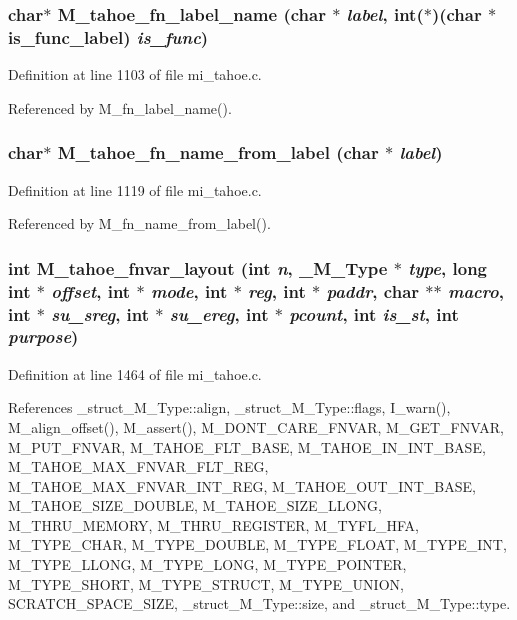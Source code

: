\subsubsection{\setlength{\rightskip}{0pt plus 5cm}char$\ast$ M\_\-tahoe\_\-fn\_\-label\_\-name (char $\ast$ {\em label}, int($\ast$)(char $\ast$is\_\-func\_\-label) {\em is\_\-func})}\label{mi__tahoe_8c_01d1fd9ed229f1ab0d78531f1cf54613}




Definition at line 1103 of file mi\_\-tahoe.c.

Referenced by M\_\-fn\_\-label\_\-name().
\subsubsection{\setlength{\rightskip}{0pt plus 5cm}char$\ast$ M\_\-tahoe\_\-fn\_\-name\_\-from\_\-label (char $\ast$ {\em label})}\label{mi__tahoe_8c_b6ece8a15107246baaedc05def0addc8}




Definition at line 1119 of file mi\_\-tahoe.c.

Referenced by M\_\-fn\_\-name\_\-from\_\-label().
\subsubsection{\setlength{\rightskip}{0pt plus 5cm}int M\_\-tahoe\_\-fnvar\_\-layout (int {\em n}, \bf{\_\-M\_\-Type} $\ast$ {\em type}, long int $\ast$ {\em offset}, int $\ast$ {\em mode}, int $\ast$ {\em reg}, int $\ast$ {\em paddr}, char $\ast$$\ast$ {\em macro}, int $\ast$ {\em su\_\-sreg}, int $\ast$ {\em su\_\-ereg}, int $\ast$ {\em pcount}, int {\em is\_\-st}, int {\em purpose})}\label{mi__tahoe_8c_aee428d5fa060639ff8dc30d577b7d28}




Definition at line 1464 of file mi\_\-tahoe.c.

References \_\-struct\_\-M\_\-Type::align, \_\-struct\_\-M\_\-Type::flags, I\_\-warn(), M\_\-align\_\-offset(), M\_\-assert(), M\_\-DONT\_\-CARE\_\-FNVAR, M\_\-GET\_\-FNVAR, M\_\-PUT\_\-FNVAR, M\_\-TAHOE\_\-FLT\_\-BASE, M\_\-TAHOE\_\-IN\_\-INT\_\-BASE, M\_\-TAHOE\_\-MAX\_\-FNVAR\_\-FLT\_\-REG, M\_\-TAHOE\_\-MAX\_\-FNVAR\_\-INT\_\-REG, M\_\-TAHOE\_\-OUT\_\-INT\_\-BASE, M\_\-TAHOE\_\-SIZE\_\-DOUBLE, M\_\-TAHOE\_\-SIZE\_\-LLONG, M\_\-THRU\_\-MEMORY, M\_\-THRU\_\-REGISTER, M\_\-TYFL\_\-HFA, M\_\-TYPE\_\-CHAR, M\_\-TYPE\_\-DOUBLE, M\_\-TYPE\_\-FLOAT, M\_\-TYPE\_\-INT, M\_\-TYPE\_\-LLONG, M\_\-TYPE\_\-LONG, M\_\-TYPE\_\-POINTER, M\_\-TYPE\_\-SHORT, M\_\-TYPE\_\-STRUCT, M\_\-TYPE\_\-UNION, SCRATCH\_\-SPACE\_\-SIZE, \_\-struct\_\-M\_\-Type::size, and \_\-struct\_\-M\_\-Type::type.

